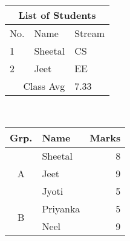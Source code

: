 \documentclass[preview, border=1pt, varwidth]{standalone}
\begin{document}
\begin{tabular}{|l|l|l|}
\hline
\multicolumn{3}{|c|}{List of Students} \\ %
\hline
No. & Name & Stream \\
\hline
1 & Sheetal & CS \\
\hline
2 & Jeet & EE \\
\hline
\multicolumn{2}{|r|}{Class Avg} & 7.33 \\ %
\hline
\end{tabular}
\\

\begin{tabular}{|c|l|r|}
\hline
Grp. & Name & Marks \\
\hline
\multirow{3}{*}{A} & Sheetal & 8 \\
                   & Jeet    & 9 \\
                   & Jyoti   & 5 \\
\hline
\multirow{2}{*}{B} & Priyanka & 5 \\
                   & Neel     & 9 \\
\hline
\end{tabular}
\end{document}
